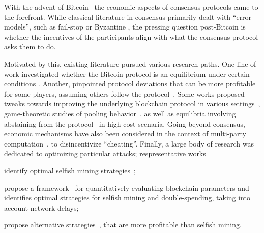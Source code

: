 With the advent of Bitcoin~\cite{nakamoto2008bitcoin} the economic aspects of
consensus protocols came to the forefront. While classical literature in
consensus primarily dealt with ``error models'', such as fail-stop or Byzantine
\cite{DBLP:journals/jacm/PeaseSL80}, the pressing question post-Bitcoin is
whether the incentives of the participants align with what the consensus
protocol asks them to do.

Motivated by this, existing literature pursued various research paths.
One line of work investigated
whether the Bitcoin protocol is an equilibrium under certain conditions
\cite{KrollDaveyFeltenWEIS2013,kiayias16EC}. Another, pinpointed protocol
deviations that can be more profitable for some players, assuming others follow
the protocol~\cite{FC:EyaSir14,FC:SapSomZoh16,FCW:JLGVM14,CCS:CKWN16}.
Some works proposed tweaks towards improving the underlying blockchain protocol
in various settings~\cite{FC:FKORVW19,koutsoupias19www}, game-theoretic studies
of pooling behavior~\cite{lewenberg15,CCS:CKWN16,ITCS:ArnWei19}, as well as
equilibria involving abstaining from the protocol~\cite{DBLP:conf/ec/FiatKKP19}
in high cost scenaria. Going beyond consensus, economic mechanisms have also
been considered in the context of multi-party
computation~\cite{CCS:KumMorBen15,FC:DavDowLar19,FC:DavDowLar18}, to
disincentivize ``cheating''.
Finally, a large body of research was dedicated to
optimizing particular attacks; respresentative works
\begin{inparaenum}[i)]
    \item identify optimal selfish mining strategies~\cite{FC:SapSomZoh16};
    \item propose a framework~\cite{CCS:GKWGRC16} for quantitatively
    evaluating blockchain parameters and identifies optimal strategies for
    selfish mining and double-spending, taking into account network delays;
    \item propose alternative strategies~\cite{EPRINT:NKMS15}, that are more
        profitable than selfish mining.
\end{inparaenum}

